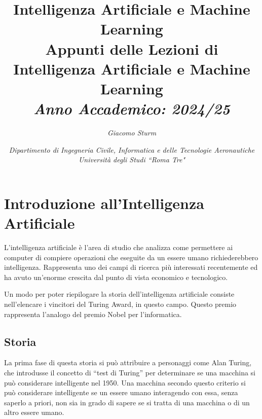 \documentclass{article}
\numberwithin{equation}{subsection}
\begin{document}
\title{%
    \textbf{Intelligenza Artificiale e Machine Learning}  \\ 
    \large Appunti delle Lezioni di Intelligenza Artificiale e Machine Learning \\
    \textit{Anno Accademico: 2024/25}}
\author{\textit{Giacomo Sturm}}
\date{\textit{Dipartimento di Ingegneria Civile, Informatica e delle Tecnologie Aeronautiche \\
Università degli Studi ``Roma Tre"}}

\maketitle
\thispagestyle{link}

\clearpage


\pagestyle{fancy}
\fancyhead{}\fancyfoot{}
\fancyfoot[C]{\thepage}

\tableofcontents

\clearpage
{}

\section{Introduzione all'Intelligenza Artificiale}


L'intelligenza artificiale è l'area di studio che analizza come permettere ai computer di 
compiere operazioni che eseguite da un essere umano richiederebbero intelligenza. 
Rappresenta uno dei campi di ricerca più interessati recentemente ed ha avuto un'enorme 
crescita dal punto di vista economico e tecnologico. 

Un modo per poter riepilogare la storia dell'intelligenza artificiale consiste nell'elencare 
i vincitori del Turing Award, in questo campo. Questo premio rappresenta l'analogo del 
premio Nobel per l'informatica. 

\subsection{Storia}

La prima fase di questa storia si può attribuire a personaggi come Alan Turing, che introdusse 
il concetto di ``test di Turing'' per determinare se una macchina si può considerare 
intelligente nel 1950. Una macchina secondo questo criterio si può considerare intelligente se 
un essere umano interagendo con essa, senza saperlo a priori, non sia in grado di sapere 
se si tratta di una macchina o di un altro essere umano. 
\end{document}
